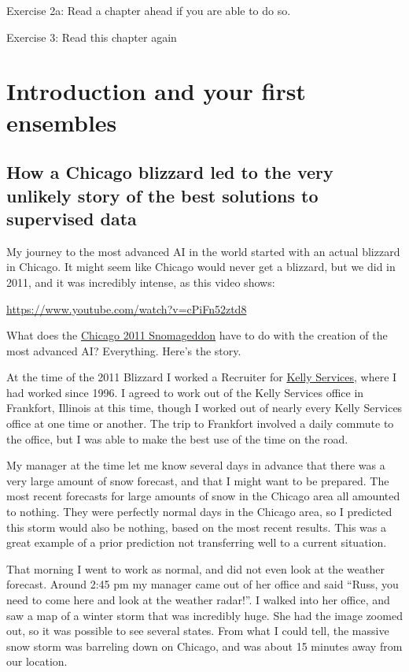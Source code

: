 \documentclass[
]{book}
\begin{document}
Exercise 2a: Read a chapter ahead if you are able to do so.

Exercise 3: Read this chapter again

\chapter{Introduction and your first ensembles}\label{introduction-and-your-first-ensembles}

\section{How a Chicago blizzard led to the very unlikely story of the best solutions to supervised data}\label{how-a-chicago-blizzard-led-to-the-very-unlikely-story-of-the-best-solutions-to-supervised-data}

My journey to the most advanced AI in the world started with an actual
blizzard in Chicago. It might seem like Chicago would never get a
blizzard, but we did in 2011, and it was incredibly intense, as this
video shows:

\url{https://www.youtube.com/watch?v=cPiFn52ztd8}

What does the \href{https://en.wikipedia.org/wiki/2011_Groundhog_Day_blizzard}{Chicago 2011
Snomageddon}
have to do with the creation of the most advanced AI? Everything. Here's
the story.

At the time of the 2011 Blizzard I worked a Recruiter for \href{https://en.wikipedia.org/wiki/Kelly_Services}{Kelly
Services}, where I had
worked since 1996. I agreed to work out of the Kelly Services office in
Frankfort, Illinois at this time, though I worked out of nearly every
Kelly Services office at one time or another. The trip to Frankfort
involved a daily commute to the office, but I was able to make the best
use of the time on the road.

My manager at the time let me know several days in advance that there
was a very large amount of snow forecast, and that I might want to be
prepared. The most recent forecasts for large amounts of snow in the
Chicago area all amounted to nothing. They were perfectly normal days in
the Chicago area, so I predicted this storm would also be nothing, based
on the most recent results. This was a great example of a prior
prediction not transferring well to a current situation.

That morning I went to work as normal, and did not even look at the
weather forecast. Around 2:45 pm my manager came out of her office and
said ``Russ, you need to come here and look at the weather radar!''. I
walked into her office, and saw a map of a winter storm that was
incredibly huge. She had the image zoomed out, so it was possible to see
several states. From what I could tell, the massive snow storm was
barreling down on Chicago, and was about 15 minutes away from our
location.
\end{document}

